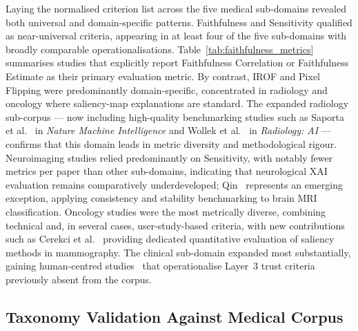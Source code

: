Laying the normalised criterion list across the five medical sub-domains
revealed both universal and domain-specific patterns. Faithfulness and
Sensitivity qualified as near-universal criteria, appearing in at least
four of the five sub-domains with broadly comparable operationalisations.
Table~\ref{tab:faithfulness_metrics} summarises studies that explicitly
report Faithfulness Correlation or Faithfulness Estimate as their primary
evaluation metric. By contrast, IROF and Pixel Flipping were predominantly
domain-specific, concentrated in radiology and oncology where saliency-map
explanations are standard. The expanded radiology sub-corpus --- now including
high-quality benchmarking studies such as Saporta et al.~\cite{saporta2022benchmarking}
in \textit{Nature Machine Intelligence} and Wollek et al.~\cite{wollek2023attention}
in \textit{Radiology: AI} --- confirms that this domain leads in metric diversity
and methodological rigour. Neuroimaging studies relied predominantly on Sensitivity,
with notably fewer metrics per paper than other sub-domains, indicating that
neurological XAI evaluation remains comparatively underdeveloped; Qin~\cite{qin2025consistency}
represents an emerging exception, applying consistency and stability benchmarking
to brain MRI classification. Oncology studies were the most metrically diverse, combining
technical and, in several cases, user-study-based criteria, with new contributions such
as Cerekci et al.~\cite{cerekci2024quantitative} providing dedicated quantitative evaluation
of saliency methods in mammography. The clinical sub-domain expanded most substantially,
gaining human-centred studies~\cite{rezaeian2026explainability,bauer2025human,finzel2024human}
that operationalise Layer~3 trust criteria previously absent from the corpus.

 

\subsection{Taxonomy Validation Against Medical Corpus}

